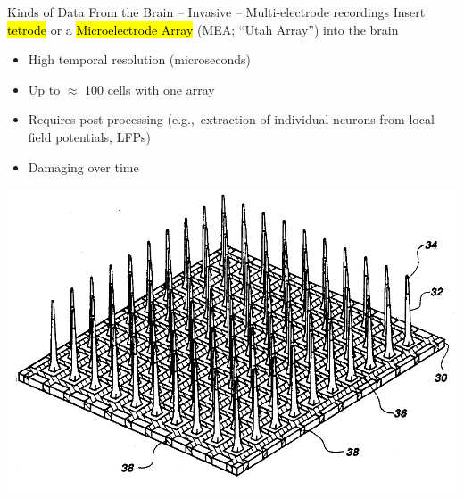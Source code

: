 \documentclass[handout,aspectratio=169]{beamer}
\begin{document}

\begin{frame}{Kinds of Data From the Brain -- Invasive -- Multi-electrode recordings}
	\vspace{0.5cm}
	Insert \hl{tetrode} or a \hl{Microelectrode Array} (MEA; \enquote{Utah Array}) into the brain\\[0.25cm]
	\begin{multicols}{2}
		\begin{itemize}
			\item[\OPlus] High temporal resolution (microseconds)
			\item[\OMeh] Up to $\approx$ 100 cells with one array
			\item[\OMeh] Requires post-processing (e.g.,~extraction of individual neurons from local field potentials, LFPs)
		\end{itemize}
		\columnbreak
		\begin{itemize}
			\item[\OMinus] Damaging over time
		\end{itemize}
		\centering
		\includegraphics[width=0.9\columnwidth]{media/utah_array_patent.jpg}
	\end{multicols}
\end{frame}

\end{document}
